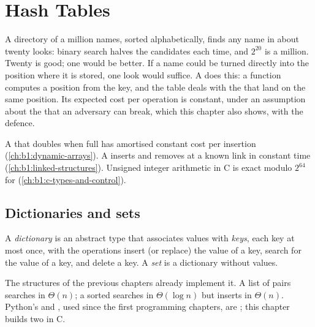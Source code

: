 \chapter{Hash Tables}\label{ch:b1:hash-tables}

A directory of a million names, sorted alphabetically, finds any name in about twenty looks: binary search halves the
candidates each time, and $2^{20}$ is a million. Twenty is good; one would be better. If a name could be turned
directly into the position where it is stored, one look would suffice. A  does this: a function computes a
position from the key, and the table deals with the  that land on the same position. Its expected cost per
operation is constant, under an assumption about the  that an adversary can break, which this chapter also shows,
with the defence.

\begin{recall}
A  that doubles when full has amortised constant cost per insertion (\cref{ch:b1:dynamic-arrays}). A
 inserts and removes at a known link in constant time (\cref{ch:b1:linked-structures}). Unsigned
integer arithmetic in C is exact modulo $2^{64}$ for  (\cref{ch:b1:c-types-and-control}).
\end{recall}

\section{Dictionaries and sets}\label{sec:b1:hash-tables:dictionaries}

\begin{definition}\label{def:b1:hash-tables:dictionary}
A \emph{dictionary} is an abstract type that associates values with
\emph{keys}, each key at most once, with the operations insert (or replace) the value of a
key, search for the value of a key, and delete a key. A \emph{set} is a dictionary without values.
\end{definition}

The structures of the previous chapters already implement it. A list of pairs searches in $\Theta(n)$; a sorted 
searches in $\Theta(\log n)$ but inserts in $\Theta(n)$. Python's  and , used since the first
programming chapters, are ; this chapter builds two in C.

